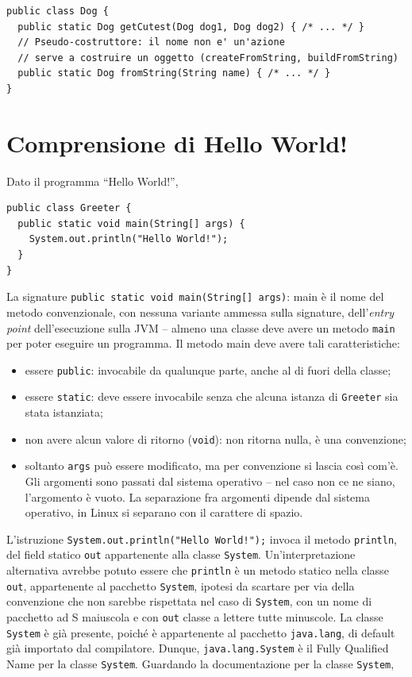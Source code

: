 \documentclass[\fontsizeclass,twocolumn]{\classname}
\theoremstyle{definition}
\theoremstyle{definition}
\begin{document}
\begin{lstlisting}
public class Dog {
  public static Dog getCutest(Dog dog1, Dog dog2) { /* ... */ }
  // Pseudo-costruttore: il nome non e' un'azione
  // serve a costruire un oggetto (createFromString, buildFromString)
  public static Dog fromString(String name) { /* ... */ }
}
\end{lstlisting}

\section{Comprensione di Hello World!}

Dato il programma ``Hello World!'',

\begin{lstlisting}
public class Greeter {
  public static void main(String[] args) {
    System.out.println("Hello World!");
  }
}
\end{lstlisting}

La signature \texttt{public static void main(String[] args)}: main è il nome
del metodo convenzionale, con nessuna variante ammessa sulla signature,
dell'\emph{entry point} dell'esecuzione sulla JVM \--- almeno una classe deve
avere un metodo \texttt{main} per poter eseguire un programma. Il metodo main
deve avere tali caratteristiche:
\begin{itemize}
    \item essere \texttt{public}: invocabile da qualunque parte, anche al di
        fuori della classe;
    \item essere \texttt{static}: deve essere invocabile senza che alcuna
        istanza di \texttt{Greeter} sia stata istanziata;
    \item non avere alcun valore di ritorno (\texttt{void}): non ritorna nulla,
        è una convenzione;
    \item soltanto \texttt{args} può essere modificato, ma per convenzione si
        lascia così com'è. Gli argomenti sono passati dal sistema operativo
        \--- nel caso non ce ne siano, l'argomento è vuoto. La separazione fra
        argomenti dipende dal sistema operativo, in Linux si separano con il
        carattere di spazio.
\end{itemize}

L'istruzione \texttt{System.out.println("Hello World!");} invoca il metodo
\texttt{println}, del field statico \texttt{out} appartenente alla classe
\texttt{System}. Un'interpretazione alternativa avrebbe potuto essere che
\texttt{println} è un metodo statico nella classe \texttt{out}, appartenente al
pacchetto \texttt{System}, ipotesi da scartare per via della convenzione che
non sarebbe rispettata nel caso di \texttt{System}, con un nome di pacchetto ad
S maiuscola e con \texttt{out} classe a lettere tutte minuscole. La classe
\texttt{System} è già presente, poiché è appartenente al pacchetto
\texttt{java.lang}, di default già importato dal compilatore. Dunque,
\texttt{java.lang.System} è il Fully Qualified Name per la classe
\texttt{System}. Guardando la documentazione per la classe \texttt{System},
\end{document}
